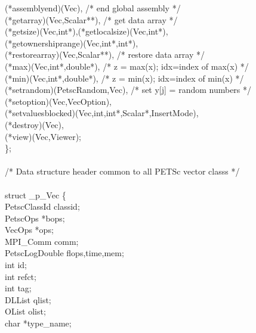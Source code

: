 \documentclass[twoside,12pt]{../sty/report_petsc}
\begin{document}
\begin{tabbing}
       (*assemblyend)(Vec),              /* end global assembly */\\
       (*getarray)(Vec,Scalar**),        /* get data array */\\
       (*getsize)(Vec,int*),(*getlocalsize)(Vec,int*),\\
       (*getownershiprange)(Vec,int*,int*),\\
       (*restorearray)(Vec,Scalar**),    /* restore data array */\\
       (*max)(Vec,int*,double*),         /* z = max(x); idx=index of max(x) */\\
       (*min)(Vec,int*,double*),         /* z = min(x); idx=index of min(x) */\\
       (*setrandom)(PetscRandom,Vec),    /* set y[j] = random numbers */\\
       (*setoption)(Vec,VecOption),\\
       (*setvaluesblocked)(Vec,int,int*,Scalar*,InsertMode),\\
       (*destroy)(Vec),\\
       (*view)(Vec,Viewer);\\
\};\\
\\
/* Data structure header common to all PETSc vector classs */\\
\\
struct \_p\_Vec \{\\
  PetscClassId           classid;                                  \\
  PetscOps               *bops;                                   \\
  VecOps                 *ops;                                    \\
  MPI\_Comm               comm;\\
  PetscLogDouble         flops,time,mem;                          \\
  int                    id;                                      \\
  int                    refct;                                   \\
  int                    tag;                                     \\
  DLList                 qlist;                                   \\
  OList                  olist;                                   \\
  char                   *type\_name;                              \\

\end{tabbing}
\end{document}
